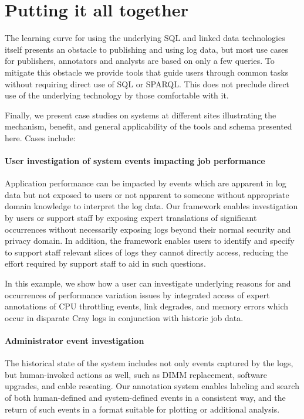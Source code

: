 \section{Putting it all together}
The learning curve for using the underlying SQL and linked data technologies
itself presents an obstacle to publishing and using log data, but most use
cases for publishers, annotators and analysts are based on only a few queries.
To mitigate this obstacle we provide tools that guide users through common
tasks without requiring direct use of SQL or SPARQL. This does not preclude
direct use of the underlying technology by those comfortable with it.

Finally, we present case studies on systems at different sites illustrating the mechanism,
benefit, and general applicability of the tools and schema presented here. Cases include:

\paragraph{User investigation of system events impacting job performance} Application
performance can be impacted by events which are apparent in log data but not exposed to 
users or not apparent to someone without appropriate domain knowledge to interpret the
log data. Our framework enables investigation by users or support staff by exposing 
expert translations of significant occurrences without necessarily exposing logs beyond
their normal security and privacy domain. In addition, the framework enables users to
identify and specify to support staff relevant slices of logs they cannot directly 
access, reducing the effort required by support staff to aid in such questions.

In this example, we show how a user can investigate underlying reasons for and
occurrences of performance variation issues by integrated access of expert annotations 
of CPU throttling events, link degrades, and memory errors which occur in disparate 
Cray logs in conjunction with historic job data.

\paragraph{Administrator event investigation}
The historical state of the system includes not only events captured by the logs, but
human-invoked actions as well, such as DIMM replacement, software upgrades, and cable reseating.
Our annotation system enables labeling and search of both human-defined and system-defined events
in a consistent way, and the return of such events in a format suitable for plotting or additional analysis.

